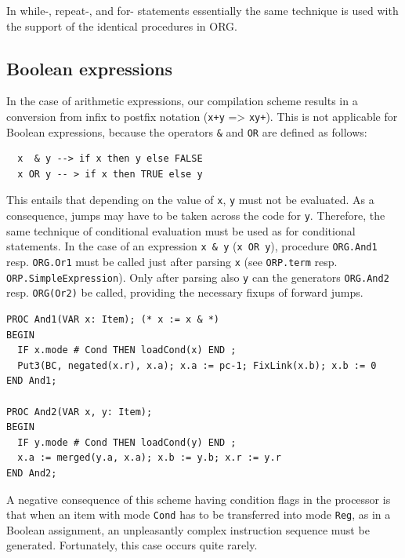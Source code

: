 In while-, repeat-, and for- statements essentially the same technique is used with the support of the
identical procedures in ORG.

\subsection{Boolean expressions}
In the case of arithmetic expressions, our compilation scheme results in a conversion from infix to
postfix notation (\verb|x+y| => \verb|xy+|). This is not applicable for Boolean expressions, because
the operators \verb|&| and \verb|OR| are defined as follows:
\begin{verbatim}
  x  & y --> if x then y else FALSE
  x OR y -- > if x then TRUE else y
\end{verbatim}

This entails that depending on the value of \verb|x|, \verb|y| must not be evaluated. As a consequence,
jumps may have to be taken across the code for \verb|y|. Therefore, the same technique of conditional
evaluation must be used as for conditional statements. In the case of an expression \verb|x & y|
(\verb|x OR y|), procedure \verb|ORG.And1| resp. \verb|ORG.Or1| must be called just after parsing
\verb|x| (see \verb|ORP.term| resp. \verb|ORP.SimpleExpression|). Only after parsing also \verb|y| can
the generators \verb|ORG.And2| resp. \verb|ORG(Or2)| be called, providing the necessary fixups of
forward jumps.
\begin{verbatim}
PROC And1(VAR x: Item); (* x := x & *)
BEGIN
  IF x.mode # Cond THEN loadCond(x) END ;
  Put3(BC, negated(x.r), x.a); x.a := pc-1; FixLink(x.b); x.b := 0
END And1;

PROC And2(VAR x, y: Item);
BEGIN
  IF y.mode # Cond THEN loadCond(y) END ;
  x.a := merged(y.a, x.a); x.b := y.b; x.r := y.r
END And2;
\end{verbatim}

A negative consequence of this scheme having condition flags in the processor is that when an item
with mode \verb|Cond| has to be transferred into mode \verb|Reg|, as in a Boolean assignment, an
unpleasantly complex instruction sequence must be generated.  Fortunately, this case occurs quite
rarely.

